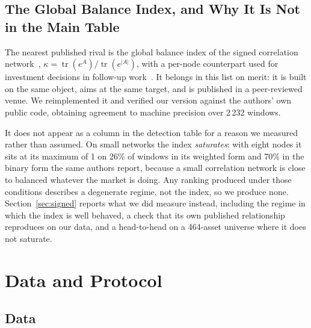 \documentclass[11pt,a4paper]{article}
\begin{document}
\subsection{The Global Balance Index, and Why It Is Not in the Main Table}
\label{sec:balancebench}

The nearest published rival is the global balance index of the signed
correlation network~\cite{bartesaghi2025}, $\kappa = \operatorname{tr}(e^A) /
\operatorname{tr}(e^{|A|})$, with a per-node counterpart used for investment
decisions in follow-up work~\cite{bartesaghi2025local}. It belongs in this list
on merit: it is built on the same object, aims at the same target, and is
published in a peer-reviewed venue. We reimplemented it and verified our
version against the authors' own public code, obtaining agreement to machine
precision over 2\,232 windows.

It does not appear as a column in the detection table for a reason we measured
rather than assumed. On small networks the index \emph{saturates}: with eight
nodes it sits at its maximum of 1 on 26\% of windows in its weighted form and
70\% in the binary form the same authors report, because a small correlation
network is close to balanced whatever the market is doing. Any ranking produced
under those conditions describes a degenerate regime, not the index, so we
produce none. Section~\ref{sec:signed} reports what we did measure instead,
including the regime in which the index is well behaved, a check that its own
published relationship reproduces on our data, and a head-to-head on a
464-asset universe where it does not saturate.



\section{Data and Protocol}

\subsection{Data}
\end{document}
